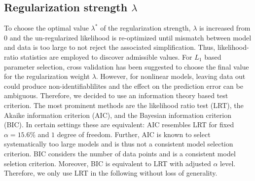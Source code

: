 \documentclass{bioinfo}
\begin{document}
\subsection{Regularization strength $\lambda$}
To choose the optimal value $\lambda^*$ of the regularization strength, $\lambda$ is increased from 0 and the un-regularized likelihood is re-optimized until mismatch between model and data is too large to not reject the associated simplification.
Thus, likelihood-ratio statistics are employed to discover admissible values.
For $L_1$ based parameter selection, cross validation has been suggested to choose the final value for the regularization weight $\lambda$.
However, for nonlinear models, leaving data out could produce non-identifiablilites and the effect on the prediction error can be ambiguous.
Therefore, we decided to use an information theory based test criterion.
The most prominent methods are the likelihood ratio test (LRT), the Akaike information criterion (AIC), and the Bayesian information criterion (BIC).
In certain settings these are equivalent:
AIC resembles LRT for fixed $\alpha = 15.6\%$ and $1$ degree of freedom.
Further, AIC is known to select systematically too large models and is thus not a consistent model selection criterion.
BIC considers the number of data points and is a consistent model seletion criterion.
Moreover, BIC is equivalent to LRT with adjusted $\alpha$ level.
Therefore, we only use LRT in the following without loss of generality.
\end{document}
